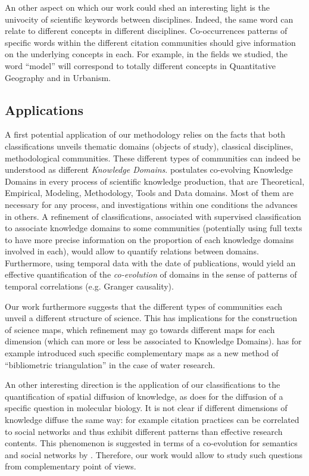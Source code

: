 An other aspect on which our work could shed an interesting light is the univocity of scientific keywords between disciplines. Indeed, the same word can relate to different concepts in different disciplines. Co-occurrences patterns of specific words within the different citation communities should give information on the underlying concepts in each. For example, in the fields we studied, the word ``model'' will correspond to totally different concepts in Quantitative Geography and in Urbanism.



\subsection*{Applications}


A first potential application of our methodology relies on the facts that both classifications unveils thematic domains (objects of study), classical disciplines, methodological communities. These different types of communities can indeed be understood as different \emph{Knowledge Domains}. \cite{raimbault2017applied} postulates co-evolving Knowledge Domains in every process of scientific knowledge production, that are Theoretical, Empirical, Modeling, Methodology, Tools and Data domains. Most of them are necessary for any process, and investigations within one conditions the advances in others. A refinement of classifications, associated with supervised classification to associate knowledge domains to some communities (potentially using full texts to have more precise information on the proportion of each knowledge domains involved in each), would allow to quantify relations between domains. Furthermore, using temporal data with the date of publications, would yield an effective quantification of the \emph{co-evolution} of domains in the sense of patterns of temporal correlations (e.g. Granger causality).

Our work furthermore suggests that the different types of communities each unveil a different structure of science. This has implications for the construction of science maps, which refinement may go towards different maps for each dimension (which can more or less be associated to Knowledge Domains). \cite{wen2017mapping} has for example introduced such specific complementary maps as a new method of ``bibliometric triangulation'' in the case of water research.


An other interesting direction is the application of our classifications to the quantification of spatial diffusion of knowledge, as \cite{maisonobe2013diffusion} does for the diffusion of a specific question in molecular biology. It is not clear if different dimensions of knowledge diffuse the same way: for example citation practices can be correlated to social networks and thus exhibit different patterns than effective research contents. This phenomenon is suggested in terms of a co-evolution for semantics and social networks by \cite{roth2010social}. Therefore, our work would allow to study such questions from complementary point of views.



